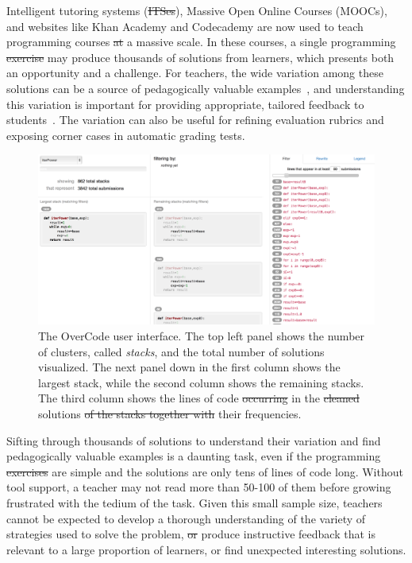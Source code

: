 \documentclass[12pt,twoside]{mitthesis}
\providecommand{\DIFaddtex}[1]{{\protect\color{blue}\uwave{#1}}} %
\providecommand{\DIFdeltex}[1]{{\protect\color{red}\sout{#1}}}                      %
\providecommand{\DIFaddbegin}{} %
\providecommand{\DIFaddend}{} %
\providecommand{\DIFdelbegin}{} %
\providecommand{\DIFdelend}{} %
\providecommand{\DIFaddFL}[1]{\DIFadd{#1}} %
\providecommand{\DIFdelFL}[1]{\DIFdel{#1}} %
\providecommand{\DIFaddbeginFL}{} %
\providecommand{\DIFaddendFL}{} %
\providecommand{\DIFdelbeginFL}{} %
\providecommand{\DIFdelendFL}{} %
\providecommand{\DIFadd}[1]{\texorpdfstring{\DIFaddtex{#1}}{#1}} %
\providecommand{\DIFdel}[1]{\texorpdfstring{\DIFdeltex{#1}}{}} %
\begin{document}
Intelligent tutoring systems (\DIFdelbegin \DIFdel{ITSes}\DIFdelend \DIFaddbegin \DIFadd{ITS}\DIFaddend ), Massive Open Online Courses (MOOCs), and websites like Khan Academy and Codecademy are now used to teach programming courses \DIFdelbegin \DIFdel{at }\DIFdelend \DIFaddbegin \DIFadd{on }\DIFaddend a massive scale. In these courses, a single programming \DIFdelbegin \DIFdel{exercise }\DIFdelend \DIFaddbegin \DIFadd{problem }\DIFaddend may produce thousands of solutions from learners, which presents both an opportunity and a challenge. For teachers, the wide variation among these solutions can be a source of pedagogically valuable examples~\cite{marton13}, and understanding this variation is important for providing appropriate, tailored feedback to students~\cite{basupowergrading,MOOCshop}. The variation can also be useful for refining evaluation rubrics and exposing corner cases in automatic grading tests.

\begin{figure}[t!]
\centering
\includegraphics[width=1.0\linewidth]{Body/figures/overcode/interfaceScreenShot.png}
\caption{The OverCode user interface. The top left panel shows the number of clusters, called {\it stacks}, and the total number of solutions visualized. The next panel down in the first column shows the largest stack, while the second column shows the remaining stacks. The third column shows the lines of code \DIFdelbeginFL \DIFdelFL{occurring }\DIFdelendFL in the \DIFdelbeginFL \DIFdelFL{cleaned }\DIFdelendFL \DIFaddbeginFL \DIFaddFL{platonic }\DIFaddendFL solutions \DIFdelbeginFL \DIFdelFL{of the stacks together with }\DIFdelendFL \DIFaddbeginFL \DIFaddFL{and }\DIFaddendFL their frequencies.}
\label{overcode_fullinterface}
\end{figure}

Sifting through thousands of solutions to understand their variation and find pedagogically valuable examples is a daunting task, even if the programming \DIFdelbegin \DIFdel{exercises }\DIFdelend \DIFaddbegin \DIFadd{problems }\DIFaddend are simple and the solutions are only tens of lines of code long. Without tool support, a teacher may not read more than 50-100 of them before growing frustrated with the tedium of the task. Given this small sample size, teachers cannot be expected to develop a thorough understanding of the variety of strategies used to solve the problem, \DIFdelbegin \DIFdel{or }\DIFdelend produce instructive feedback that is relevant to a large proportion of learners, or find unexpected interesting solutions.
\end{document}
